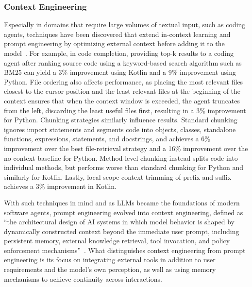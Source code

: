 \documentclass[
english,                 %
bibtex,                  %
]{kththesis}
\numberwithin{listing}{chapter}
\begin{document}
\subsubsection{Context Engineering}
\label{sec:bg_context_engineering}

Especially in domains that require large volumes of textual input, such as coding agents, techniques have been discovered that extend in-context learning and prompt engineering by optimizing external context before adding it to the model~\cite{yusuf_beyond_2025}. For example, in code completion, providing top-k results to a coding agent after ranking source code using a keyword-based search algorithm such as \gls{BM25} can yield a 3\% improvement using Kotlin and a 9\% improvement using Python. File ordering also affects performance, as placing the most relevant files closest to the cursor position and the least relevant files at the beginning of the context ensures that when the context window is exceeded, the agent truncates from the left, discarding the least useful files first, resulting in a 3\% improvement for Python. Chunking strategies similarly influence results. Standard chunking ignores import statements and segments code into objects, classes, standalone functions, expressions, statements, and docstrings, and achieves a 6\% improvement over the best file-retrieval strategy and a 16\% improvement over the no-context baseline for Python. Method-level chunking instead splits code into individual methods, but performs worse than standard chunking for Python and similarly for Kotlin. Lastly, local scope context trimming of prefix and suffix achieves a 3\% improvement in Kotlin.

With such techniques in mind and as \glspl{LLM} became the foundations of modern software agents, prompt engineering evolved into context engineering, defined as ``the architectural design of \gls{AI} systems in which model behavior is shaped by dynamically constructed context beyond the immediate user prompt, including persistent memory, external knowledge retrieval, tool invocation, and policy enforcement mechanisms''~\cite{cinar_prompt_2026}. What distinguishes context engineering from prompt engineering is its focus on integrating external tools in addition to user requirements and the model's own perception, as well as using memory mechanisms to achieve continuity across interactions.
\end{document}
